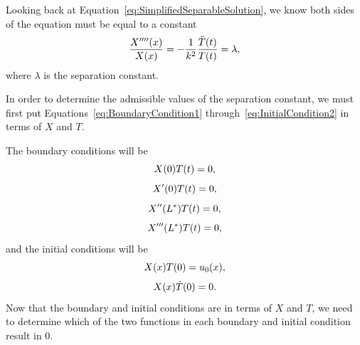 \documentclass[12pt]{article}
\begin{document}
Looking back at Equation~\eqref{eq:SimplifiedSeparableSolution}, we know both sides of the equation must be equal to a constant
\begin{equation}\label{eq:SeparableSolutionConstant}
    \centering
    \frac{X''''(x)}{X(x)} = -\frac{1}{k^2}\frac{\ddot{T}(t)}{T(t)} = \lambda,
\end{equation}
where $\lambda$ is the separation constant.

In order to determine the admissible values of the separation constant, we must first put Equations~\eqref{eq:BoundaryCondition1} through~\eqref{eq:InitialCondition2} in terms of $X$ and $T$. 

The boundary conditions will be 
\begin{equation}\label{eq:BoundaryConditionX}
    \centering
    X(0)T(t) = 0,
\end{equation}
\begin{equation}\label{eq:BoundaryConditionX'}
    \centering
    X'(0)T(t) = 0,
\end{equation}
\begin{equation}\label{eq:BoundaryConditionX''}
    \centering
    X''(L^*)T(t) = 0,
\end{equation}
\begin{equation}\label{eq:BoundaryConditionX'''}
    \centering
    X'''(L^*)T(t) = 0,
\end{equation}
and the initial conditions will be
\begin{equation}\label{eq:InitialConditionX}
    \centering
    X(x)T(0) = u_0(x), 
\end{equation}
\begin{equation}\label{eq:InitialConditionXdot}
    \centering
    X(x)\dot{T}(0) = 0.
\end{equation}
Now that the boundary and initial conditions are in terms of  $X$ and $T$, we need to determine which of the two functions in each boundary and initial condition result in 0. 
\end{document}
